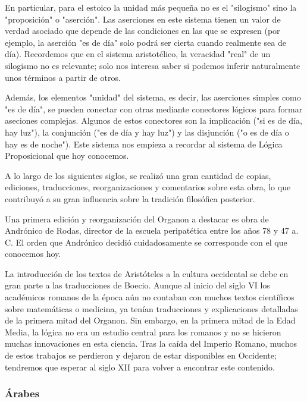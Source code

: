 \documentclass{article}
\begin{document}
En particular, para el estoico la unidad más pequeña no es el "silogismo" sino la "proposición" o "aserción". Las aserciones en este sistema tienen un valor de verdad asociado que depende de las condiciones en las que se expresen (por ejemplo, la aserción "es de día" solo podrá ser cierta cuando realmente sea de día). Recordemos que en el sistema aristotélico, la veracidad "real" de un silogismo no es relevante; solo nos interesa saber si podemos inferir naturalmente unos términos a partir de otros.

Además, los elementos "unidad" del sistema, es decir, las aserciones simples como "es de día", se pueden conectar con otras mediante conectores lógicos para formar aseciones complejas. Algunos de estos conectores son la implicación ("si es de día, hay luz"), la conjunción ("es de día y hay luz") y las disjunción ("o es de día o hay es de noche")\cite{algra1999cambridge}. Este sistema nos empieza a recordar al sistema de Lógica Proposicional que hoy conocemos.

A lo largo de los siguientes siglos, se realizó una gran cantidad de copias, ediciones, traducciones, reorganizaciones y comentarios sobre esta obra, lo que contribuyó a su gran influencia sobre la tradición filosófica posterior.

Una primera edición y reorganización del Organon a destacar es obra de Andrónico de Rodas, director de la escuela peripatética entre los años 78 y 47 a. C. El orden que Andrónico decidió cuidadosamente se corresponde con el que conocemos hoy\cite{hatzimichali2013texts}.

La introducción de los textos de Aristóteles a la cultura occidental se debe en gran parte a las traducciones de Boecio. Aunque al inicio del siglo VI los académicos romanos de la época aún no contaban con muchos textos científicos sobre matemáticas o medicina, ya tenían traducciones y explicaciones detalladas de la primera mitad del Organon\cite{charles2004latin}. Sin embargo, en la primera mitad de la Edad Media, la lógica no era un estudio central para los romanos y no se hicieron muchas innovaciones en esta ciencia\cite{marebon2008logic}. Tras la caída del Imperio Romano, muchos de estos trabajos se perdieron y dejaron de estar disponibles en Occidente; tendremos que esperar al siglo XII para volver a encontrar este contenido.

\subsubsection{Árabes}
\end{document}
